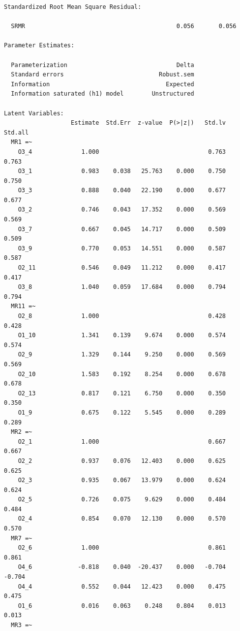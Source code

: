 \documentclass[
  letterpaper,
  DIV=11,
  numbers=noendperiod]{scrartcl}
\begin{document}
\begin{verbatim}
Standardized Root Mean Square Residual:

  SRMR                                           0.056       0.056

Parameter Estimates:

  Parameterization                               Delta
  Standard errors                           Robust.sem
  Information                                 Expected
  Information saturated (h1) model        Unstructured

Latent Variables:
                   Estimate  Std.Err  z-value  P(>|z|)   Std.lv  Std.all
  MR1 =~                                                                
    O3_4              1.000                               0.763    0.763
    O3_1              0.983    0.038   25.763    0.000    0.750    0.750
    O3_3              0.888    0.040   22.190    0.000    0.677    0.677
    O3_2              0.746    0.043   17.352    0.000    0.569    0.569
    O3_7              0.667    0.045   14.717    0.000    0.509    0.509
    O3_9              0.770    0.053   14.551    0.000    0.587    0.587
    O2_11             0.546    0.049   11.212    0.000    0.417    0.417
    O3_8              1.040    0.059   17.684    0.000    0.794    0.794
  MR11 =~                                                               
    O2_8              1.000                               0.428    0.428
    O1_10             1.341    0.139    9.674    0.000    0.574    0.574
    O2_9              1.329    0.144    9.250    0.000    0.569    0.569
    O2_10             1.583    0.192    8.254    0.000    0.678    0.678
    O2_13             0.817    0.121    6.750    0.000    0.350    0.350
    O1_9              0.675    0.122    5.545    0.000    0.289    0.289
  MR2 =~                                                                
    O2_1              1.000                               0.667    0.667
    O2_2              0.937    0.076   12.403    0.000    0.625    0.625
    O2_3              0.935    0.067   13.979    0.000    0.624    0.624
    O2_5              0.726    0.075    9.629    0.000    0.484    0.484
    O2_4              0.854    0.070   12.130    0.000    0.570    0.570
  MR7 =~                                                                
    O2_6              1.000                               0.861    0.861
    O4_6             -0.818    0.040  -20.437    0.000   -0.704   -0.704
    O4_4              0.552    0.044   12.423    0.000    0.475    0.475
    O1_6              0.016    0.063    0.248    0.804    0.013    0.013
  MR3 =~                                                                

\end{verbatim}
\end{document}
